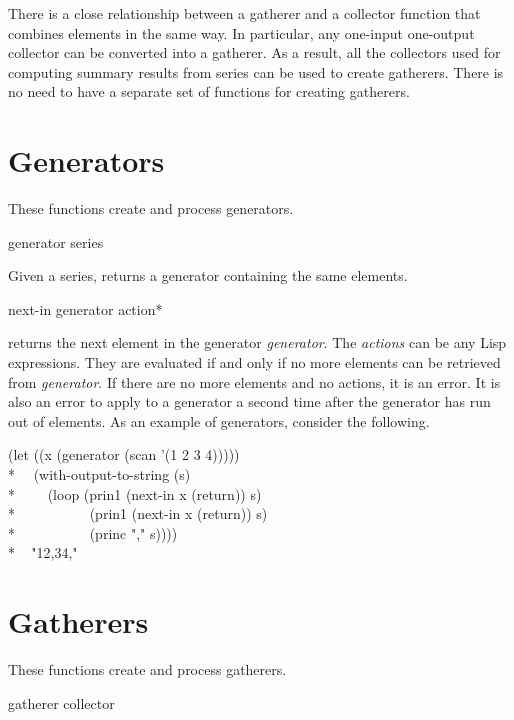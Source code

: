 \begin{new}
There is a close relationship between a gatherer and a collector function
that combines elements in the same way.  In particular, any one-input
one-output collector can be converted into a gatherer.  As a result, all
the collectors used for computing summary results from series can be used to
create gatherers.  There is no need to have a separate set of functions for
creating gatherers.


\section{Generators}

These functions create and process generators.

\begin{defun}[Function]
generator series

Given a series,  returns a generator containing the same
elements.
\end{defun}


\begin{defmac}
next-in generator {action}*

 returns the next element in the generator {\it generator}.
The {\it actions} can be any Lisp expressions.  They are evaluated if and
only if no more elements can be retrieved from {\it generator}.  If there
are no more elements and no actions, it is an error.  It is also an error
to apply  to a generator a second time after the generator has
run out of elements.  As an example of generators, consider the following.
\begin{lisp}
(let ((x (generator (scan '(1 2 3 4))))) \\*
~~(with-output-to-string (s) \\*
~~~~(loop (prin1 (next-in x (return)) s) \\*
~~~~~~~~~~(prin1 (next-in x (return)) s) \\*
~~~~~~~~~~(princ "," s)))) \\*
~{\EV} "12,34,"
\end{lisp}
\end{defmac}

\section{Gatherers}

These functions create and process gatherers.

\begin{defun}[Function]
gatherer collector


\end{defun}
\end{new}
